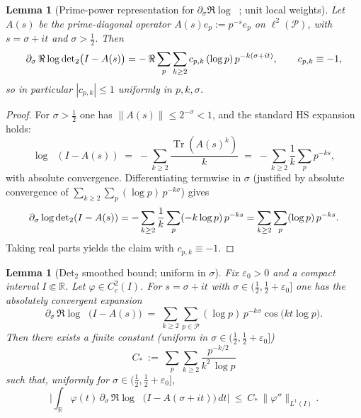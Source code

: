 \documentclass[11pt]{article}
\newtheorem{lemma}[theorem]{Lemma}
\theoremstyle{definition}
\theoremstyle{remark}
\newcommand{\R}{\mathbb{R}}
\newcommand{\PP}{\mathcal{P}}
\DeclareMathOperator{\Tr}{Tr}
\DeclareMathOperator{\dettwo}{det_2}
\begin{document}
\begin{lemma}[Prime-power representation for \(\partial_\sigma\Re\log\dettwo\); unit local weights]\label{lem:pp-rep-det2}
Let \(A(s)\) be the prime-diagonal operator \(A(s)e_p:=p^{-s}e_p\) on \(\ell^2(\PP)\), with \(s=\sigma+it\) and \(\sigma>\tfrac12\). Then
\[
  \partial_\sigma\,\Re\log\dettwo\!\big(I-A(s)\big)
  \\= -\,\Re\sum_{p}\sum_{k\ge 2} c_{p,k}\,(\log p)\,p^{-k(\sigma+it)},\qquad c_{p,k}\equiv -1,
\]
so in particular \(|c_{p,k}|\le 1\) uniformly in \(p,k,\sigma\).
\end{lemma}
\begin{proof}
For \(\sigma>\tfrac12\) one has \(\|A(s)\|\le 2^{-\sigma}<1\), and the standard HS expansion holds:
\[
  \log\dettwo(I-A(s))\;=\;-\sum_{k\ge 2} \frac{\Tr(A(s)^k)}{k}\;=\;-\sum_{k\ge 2}\frac1k\sum_{p}p^{-ks},
\]
with absolute convergence. Differentiating termwise in \(\sigma\) (justified by absolute convergence of \(\sum_{k\ge 2}\sum_p (\log p)\,p^{-k\sigma}\)) gives
\[
  \partial_\sigma \log\dettwo(I-A(s))
  \\= -\sum_{k\ge 2}\frac1k\sum_p (-k\log p)\,p^{-ks}
  \\=\sum_{k\ge 2}\sum_p (\log p)\,p^{-ks}.
\]
Taking real parts yields the claim with \(c_{p,k}\equiv -1\).
\end{proof}

\begin{lemma}[Det$_2$ smoothed bound; uniform in \(\sigma\)]\label{lem:det2-smoothed-target}
Fix \(\varepsilon_0>0\) and a compact interval \(I\Subset\R\). Let \(\varphi\in C_c^2(I)\). For \(s=\sigma+it\) with \(\sigma\in(\tfrac12,\tfrac12+\varepsilon_0]\) one has the absolutely convergent expansion
\[
 \partial_\sigma\,\Re\log\dettwo\big(I-A(s)\big)
 \;=\; \sum_{k\ge 2}\sum_{p\in\PP} (\log p)\,p^{-k\sigma}\cos\big(k t\log p\big).
\]
Then there exists a finite constant (uniform in \(\sigma\in(\tfrac12,\tfrac12+\varepsilon_0]\))
\[
 C_*\ :=\ \sum_{p}\sum_{k\ge 2}\frac{p^{-k/2}}{k^2\,\log p}
\]
such that, uniformly for \(\sigma\in(\tfrac12,\tfrac12+\varepsilon_0]\),
\[
 \Big|\int_{\R} \varphi(t)\,\partial_\sigma\,\Re\log\dettwo\big(I-A(\sigma+it)\big)\,dt\Big|
 \ \le\ C_*\,\|\varphi''\|_{L^1(I)}.
\]
\end{lemma}
\end{document}
